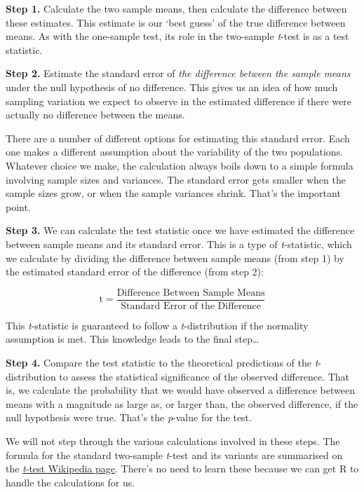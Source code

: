 \documentclass[
]{book}
\begin{document}
\textbf{Step 1.} Calculate the two sample means, then calculate the difference between these estimates. This estimate is our `best guess' of the true difference between means. As with the one-sample test, its role in the two-sample \emph{t}-test is as a test statistic.

\textbf{Step 2.} Estimate the standard error of \emph{the difference between the sample means} under the null hypothesis of no difference. This gives us an idea of how much sampling variation we expect to observe in the estimated difference if there were actually no difference between the means.

There are a number of different options for estimating this standard error. Each one makes a different assumption about the variability of the two populations. Whatever choice we make, the calculation always boils down to a simple formula involving sample sizes and variances. The standard error gets smaller when the sample sizes grow, or when the sample variances shrink. That's the important point.

\textbf{Step 3.} We can calculate the test statistic once we have estimated the difference between sample means and its standard error. This is a type of \emph{t}-statistic, which we calculate by dividing the difference between sample means (from step 1) by the estimated standard error of the difference (from step 2):

\[\text{t} = \frac{\text{Difference Between Sample Means}}{\text{Standard Error of the Difference}}\]

This \emph{t}-statistic is guaranteed to follow a \emph{t}-distribution if the normality assumption is met. This knowledge leads to the final step\ldots{}

\textbf{Step 4.} Compare the test statistic to the theoretical predictions of the \emph{t}-distribution to assess the statistical significance of the observed difference. That is, we calculate the probability that we would have observed a difference between means with a magnitude as large as, or larger than, the observed difference, if the null hypothesis were true. That's the \emph{p}-value for the test.

We will not step through the various calculations involved in these steps. The formula for the standard two-sample \emph{t}-test and its variants are summarised on the \href{https://en.wikipedia.org/wiki/Student\%27s_t-test\#Independent_two-sample_t-test}{\emph{t}-test Wikipedia page}. There's no need to learn these because we can get R to handle the calculations for us.
\end{document}
